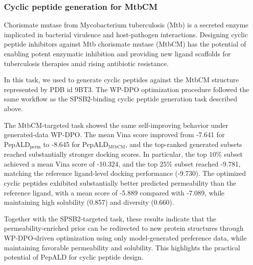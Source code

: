 \subsubsection{Cyclic peptide generation for MtbCM}\label{subsubsec:mtbcm_generation}

Chorismate mutase from Mycobacterium tuberculosis (Mtb) is a secreted enzyme implicated in bacterial virulence and host-pathogen interactions. 
Designing cyclic peptide inhibitors against Mtb chorismate mutase (MtbCM) has the potential of enabling potent enzymatic inhibition and providing new ligand scaffolds for tuberculosis therapies amid rising antibiotic resistance.

In this task, we used \mytool to generate cyclic peptides against the MtbCM structure represented by PDB id 9BT3. The WP-DPO optimization procedure followed the same workflow as the SPSB2-binding cyclic peptide generation task described above.

The MtbCM-targeted task showed the same self-improving behavior under generated-data WP-DPO.
The mean Vina score improved from \mbox{-7.641} for PepALD$_{\mathrm{perm}}$ to \mbox{-8.645} for PepALD$_{\mathrm{MtbCM}}$, and the top-ranked generated subsets reached substantially stronger docking scores.
In particular, the top $10\%$ subset achieved a mean Vina score of -10.324, and the top $25\%$ subset reached -9.781, matching the reference ligand-level docking performance (-9.730).
The optimized cyclic peptides exhibited substantially better predicted permeability than the reference ligand, with a mean score of -5.889 compared with -7.089, while maintaining high solubility (0.857) and diversity (0.660).

Together with the SPSB2-targeted task, these results indicate that the permeability-enriched \mytool prior can be redirected to new protein structures through WP-DPO-driven optimization using only model-generated preference data, while maintaining favorable permeability and solubility.
This highlights the practical potential of PepALD for cyclic peptide design.

